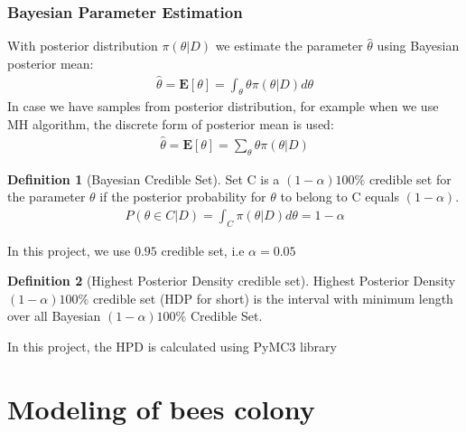 \documentclass[12pt]{article}
\theoremstyle{definition}
\newtheorem{definition}{Definition}[section]
\begin{document}
\subsubsection{Bayesian Parameter Estimation}
With posterior distribution $\pi(\theta|D)$ we estimate the parameter
$\hat{\theta}$ using Bayesian posterior mean:
\begin{align*}
  \hat{\theta} = \mathbf{E}[\theta] = \int_\theta \theta \pi(\theta|D) d\theta
\end{align*}
In case we have samples from posterior distribution, for example when we use MH
algorithm, the discrete form of posterior mean is used:
\begin{align*}
  \hat{\theta} = \mathbf{E}[\theta] = \sum_\theta \theta \pi(\theta|D)
\end{align*}
\begin{definition}[Bayesian Credible Set]
  Set C is a $(1 − \alpha )100\%$ credible set for the parameter $\theta$ if the posterior
  probability for $\theta$ to belong to C equals $(1 − \alpha)$.
  \begin{align*}
    P(\theta \in C | D) = \int_C \pi(\theta|D) d\theta = 1 - \alpha
  \end{align*}
\end{definition}
In this project, we use $0.95$ credible set, i.e $\alpha=0.05$
\begin{definition}[Highest Posterior Density credible set]
  Highest Posterior Density $(1-\alpha)100\%$ credible set (HDP for short) is the
  interval with minimum length over all Bayesian $(1-\alpha)100\%$ Credible Set.
\end{definition}
In this project, the HPD is calculated using PyMC3 library
\cite{salvatier2016pymc3}

\section{Modeling of bees colony}
\end{document}
